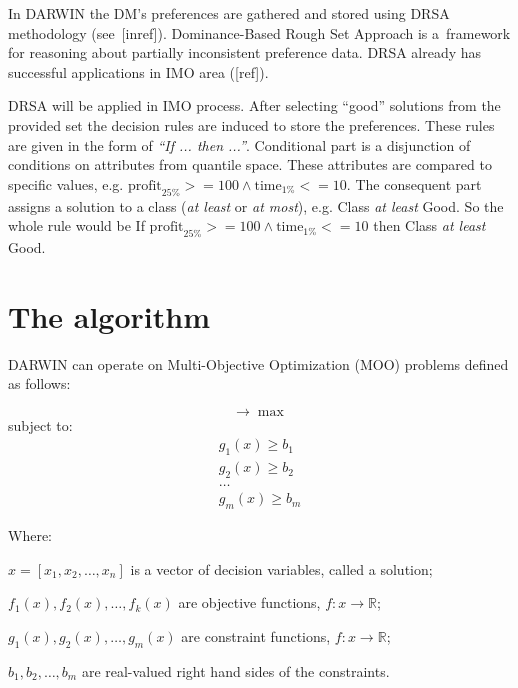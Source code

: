 In DARWIN the DM's preferences are gathered and stored using DRSA methodology
(see~[inref]). Dominance-Based Rough Set Approach is a~framework for reasoning
about partially inconsistent preference data. DRSA already has successful
applications in IMO area ([ref]).

DRSA will be applied in IMO process. After selecting ``good'' solutions from
the provided set the decision rules are induced to store the
preferences. These rules are given in the form of \textit{``If ... then
  ...''}. Conditional part is a disjunction of conditions on attributes from
quantile space. These attributes are compared to specific values, e.g.
$\text{profit}_{25\%} >= 100 \land \text{time}_{1\%} <= 10$. The consequent
part assigns a solution to a class (\textit{at least} or \textit{at most}),
e.g. Class \textit{at least} Good. So the whole rule would be If
$\text{profit}_{25\%} >= 100 \land \text{time}_{1\%} <= 10$ then Class
\textit{at least} Good.

\section{The algorithm}
\label{idea-algo}


DARWIN can operate on Multi-Objective Optimization (MOO) problems defined as
follows:

\begin{equation}
[ f_1(x), f_2(x), \dots, f_k(x) ] \rightarrow  \max
\end{equation}
subject to:
\begin{equation}
\begin{array}{l}
g_1(x) \geq b_1 \\
g_2(x) \geq b_2 \\
\dots \\
g_m(x) \geq b_m
\end{array}
\end{equation}

Where:
\begin{description}
\item $x = [x_1, x_2, \dots, x_n]$ is a vector of decision variables, called a
  solution;
\item $f_1(x), f_2(x), \dots, f_k(x)$ are objective functions,
  $f: x \rightarrow \mathbb{R}$;
\item $g_1(x), g_2(x), \dots, g_m(x)$ are constraint functions,
  $f: x \rightarrow \mathbb{R}$;
\item $b_1, b_2, \dots, b_m$ are real-valued right hand sides of the
  constraints.
\end{description}

